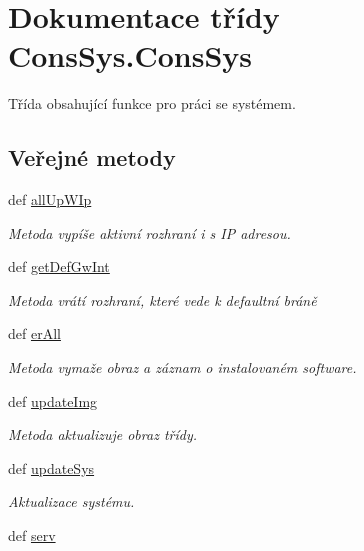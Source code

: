 \hypertarget{classConsSys_1_1ConsSys}{\section{Dokumentace třídy Cons\-Sys.\-Cons\-Sys}
\label{d9/d30/classConsSys_1_1ConsSys}
}


Třída obsahující funkce pro práci se systémem.  


\subsection*{Veřejné metody}
\begin{DoxyCompactItemize}
\item 
def \hyperlink{classConsSys_1_1ConsSys_ab1178d112f29926dcf781430cbd417fe}{all\-Up\-W\-Ip}
\begin{DoxyCompactList}\small\item\em Metoda vypíše aktivní rozhraní i s I\-P adresou. \end{DoxyCompactList}\item 
def \hyperlink{classConsSys_1_1ConsSys_a676ae0d38fa6aea12ab2dce4381ff872}{get\-Def\-Gw\-Int}
\begin{DoxyCompactList}\small\item\em Metoda vrátí rozhraní, které vede k defaultní bráně \end{DoxyCompactList}\item 
def \hyperlink{classConsSys_1_1ConsSys_a97a5ac1a37c9649118069803b50c3102}{er\-All}
\begin{DoxyCompactList}\small\item\em Metoda vymaže obraz a záznam o instalovaném software. \end{DoxyCompactList}\item 
def \hyperlink{classConsSys_1_1ConsSys_a4116e6cfbf38f6a6ae7eb6ccc8a545b8}{update\-Img}
\begin{DoxyCompactList}\small\item\em Metoda aktualizuje obraz třídy. \end{DoxyCompactList}\item 
def \hyperlink{classConsSys_1_1ConsSys_adebc704ed551e5de7db2a5fbdae6af62}{update\-Sys}
\begin{DoxyCompactList}\small\item\em Aktualizace systému. \end{DoxyCompactList}\item 
def \hyperlink{classConsSys_1_1ConsSys_aeb3c2474c312e9c4aa5b10fd26c39474}{serv}

\end{DoxyCompactItemize}
